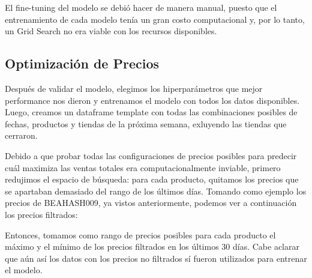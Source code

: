 \documentclass[12pt,a4paper]{article}
\begin{document}
    \vspace{0.2cm}

    El fine-tuning del modelo se debió hacer de manera manual, puesto que el entrenamiento de cada modelo tenía un gran costo computacional 
    y, por lo tanto, un Grid Search no era viable con los recursos disponibles.



\subsection{Optimización de Precios}

Después de validar el modelo, elegimos los hiperparámetros que mejor performance nos dieron y entrenamos el modelo con todos los datos 
disponibles. Luego, creamos un dataframe template con todas las combinaciones posibles de fechas, productos y tiendas de la próxima semana, 
exluyendo las tiendas que cerraron. 

\vspace{0.2cm}

Debido a que probar todas las configuraciones de precios posibles para predecir cuál maximiza las ventas totales era computacionalmente inviable, primero 
redujimos el espacio de búsqueda: para cada producto, quitamos los precios que se apartaban demasiado del rango de los últimos días. Tomando como ejemplo 
los precios de BEAHASH009, ya vistos anteriormente, podemos ver a continuación los precios filtrados:

\begin{center}
\end{center}

Entonces, tomamos como rango de precios posibles para cada producto el máximo y el mínimo de los precios filtrados en los últimos 30 días. Cabe aclarar que 
aún así los datos con los precios no filtrados sí fueron utilizados para entrenar el modelo.
\end{document}
